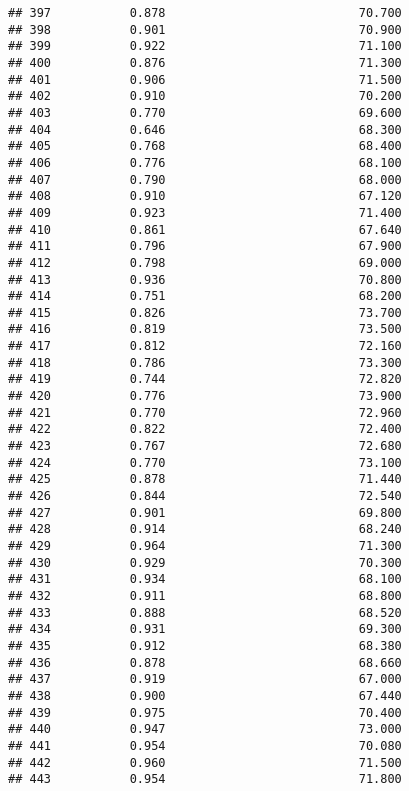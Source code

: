 \documentclass[
]{article}
\begin{document}
\begin{verbatim}
## 397           0.878                           70.700
## 398           0.901                           70.900
## 399           0.922                           71.100
## 400           0.876                           71.300
## 401           0.906                           71.500
## 402           0.910                           70.200
## 403           0.770                           69.600
## 404           0.646                           68.300
## 405           0.768                           68.400
## 406           0.776                           68.100
## 407           0.790                           68.000
## 408           0.910                           67.120
## 409           0.923                           71.400
## 410           0.861                           67.640
## 411           0.796                           67.900
## 412           0.798                           69.000
## 413           0.936                           70.800
## 414           0.751                           68.200
## 415           0.826                           73.700
## 416           0.819                           73.500
## 417           0.812                           72.160
## 418           0.786                           73.300
## 419           0.744                           72.820
## 420           0.776                           73.900
## 421           0.770                           72.960
## 422           0.822                           72.400
## 423           0.767                           72.680
## 424           0.770                           73.100
## 425           0.878                           71.440
## 426           0.844                           72.540
## 427           0.901                           69.800
## 428           0.914                           68.240
## 429           0.964                           71.300
## 430           0.929                           70.300
## 431           0.934                           68.100
## 432           0.911                           68.800
## 433           0.888                           68.520
## 434           0.931                           69.300
## 435           0.912                           68.380
## 436           0.878                           68.660
## 437           0.919                           67.000
## 438           0.900                           67.440
## 439           0.975                           70.400
## 440           0.947                           73.000
## 441           0.954                           70.080
## 442           0.960                           71.500
## 443           0.954                           71.800

\end{verbatim}
\end{document}

